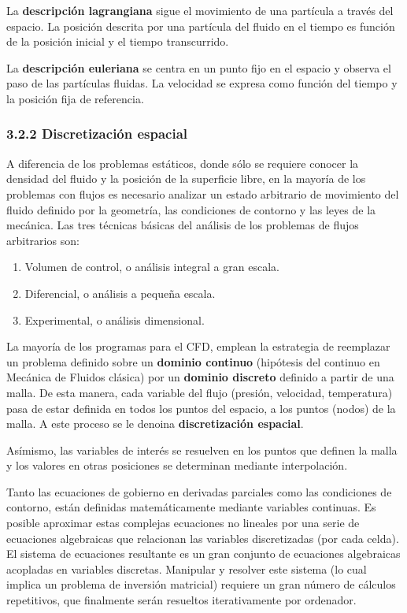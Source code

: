 La \textbf{descripción lagrangiana} sigue el movimiento de una partícula
a través del espacio. La posición descrita por una partícula del fluido
en el tiempo es función de la posición inicial y el tiempo transcurrido.

La \textbf{descripción euleriana} se centra en un punto fijo en el
espacio y observa el paso de las partículas fluidas. La velocidad se
expresa como función del tiempo y la posición fija de referencia.

\subsubsection{3.2.2 Discretización espacial}\label{header-n143}

A diferencia de los problemas estáticos, donde sólo se requiere conocer
la densidad del fluido y la posición de la superficie libre, en la
mayoría de los problemas con flujos es necesario analizar un estado
arbitrario de movimiento del fluido definido por la geometría, las
condiciones de contorno y las leyes de la mecánica. Las tres técnicas
básicas del análisis de los problemas de flujos arbitrarios son:

\begin{enumerate}
\def\labelenumi{\arabic{enumi}.}
\item
  Volumen de control, o análisis integral a gran escala.
\item
  Diferencial, o análisis a pequeña escala.
\item
  Experimental, o análisis dimensional.
\end{enumerate}

La mayoría de los programas para el CFD, emplean la estrategia de
reemplazar un problema definido sobre un \textbf{dominio continuo}
(hipótesis del continuo en Mecánica de Fluidos clásica) por un
\textbf{dominio discreto} definido a partir de una malla. De esta
manera, cada variable del flujo (presión, velocidad, temperatura) pasa
de estar definida en todos los puntos del espacio, a los puntos (nodos)
de la malla. A este proceso se le denoina \textbf{discretización
espacial}.

Asímismo, las variables de interés se resuelven en los puntos que
definen la malla y los valores en otras posiciones se determinan
mediante interpolación.

Tanto las ecuaciones de gobierno en derivadas parciales como las
condiciones de contorno, están definidas matemáticamente mediante
variables continuas. Es posible aproximar estas complejas ecuaciones no
lineales por una serie de ecuaciones algebraicas que relacionan las
variables discretizadas (por cada celda). El sistema de ecuaciones
resultante es un gran conjunto de ecuaciones algebraicas acopladas en
variables discretas. Manipular y resolver este sistema (lo cual implica
un problema de inversión matricial) requiere un gran número de cálculos
repetitivos, que finalmente serán resueltos iterativamente por
ordenador.

